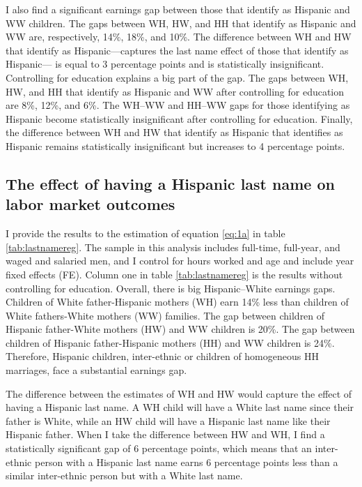 \documentclass{wptemp}
\begin{document}
I also find a significant earnings gap between those that identify as Hispanic and WW children. The gaps between WH, HW, and HH that identify as Hispanic and WW are, respectively, 14\%, 18\%, and 10\%. The difference between WH and HW that identify as Hispanic---captures the last name effect of those that identify as Hispanic--- is equal to 3 percentage points and is statistically insignificant. Controlling for education explains a big part of the gap. The gaps between WH, HW, and HH that identify as Hispanic and WW after controlling for education are 8\%, 12\%, and 6\%. The WH--WW and HH--WW gaps for those identifying as Hispanic become statistically insignificant after controlling for education. Finally, the difference between WH and HW that identify as Hispanic that identifies as Hispanic remains statistically insignificant but increases to 4 percentage points.

\subsection{The effect of having a Hispanic last name on labor market outcomes}

I provide the results to the estimation of equation \ref{eq:1a} in table \ref{tab:lastnamereg}. The sample in this analysis includes full-time, full-year, and waged and salaried men, and I control for hours worked and age and include year fixed effects (FE). Column one in table \ref{tab:lastnamereg} is the results without controlling for education. Overall, there is big Hispanic--White earnings gaps. Children of White father-Hispanic mothers (WH) earn 14\% less than children of White fathers-White mothers (WW) families. The gap between children of Hispanic father-White mothers (HW) and WW children is 20\%. The gap between children of Hispanic father-Hispanic mothers (HH) and WW children is 24\%. Therefore, Hispanic children, inter-ethnic or children of homogeneous HH marriages, face a substantial earnings gap.

The difference between the estimates of WH and HW would capture the effect of having a Hispanic last name. A WH child will have a White last name since their father is White, while an HW child will have a Hispanic last name like their Hispanic father. When I take the difference between HW and WH, I find a statistically significant gap of 6 percentage points, which means that an inter-ethnic person with a Hispanic last name earns 6 percentage points less than a similar inter-ethnic person but with a White last name.
\end{document}
